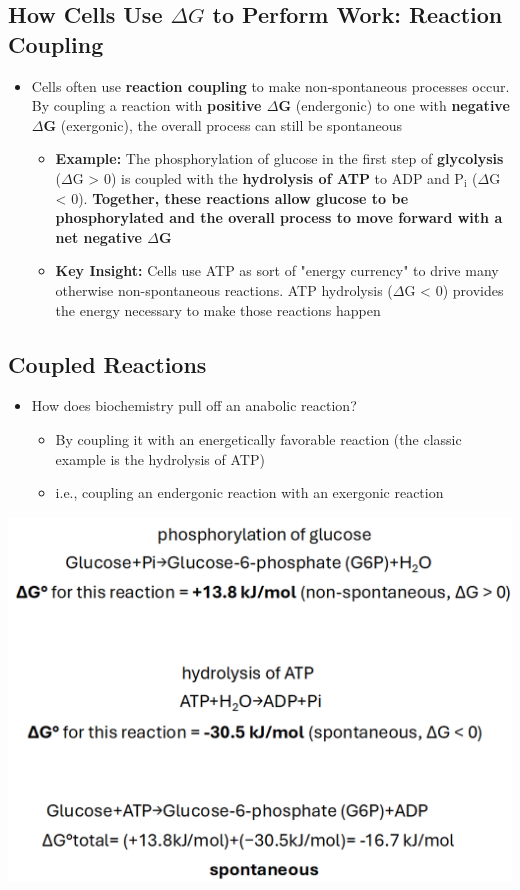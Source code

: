 \documentclass[10pt]{article}
\begin{document}
\subsection*{How Cells Use $\Delta G$ to Perform Work: Reaction Coupling}
\begin{itemize}
    \item Cells often use \textbf{reaction coupling} to make non-spontaneous processes occur.  By coupling a reaction with \textbf{positive $\Delta$G} (endergonic) to one with \textbf{negative $\Delta$G} (exergonic), the overall process can still be spontaneous
    \begin{itemize}
        \item \textbf{Example:} The phosphorylation of glucose in the first step of \textbf{glycolysis} ($\Delta$G > 0) is coupled with the \textbf{hydrolysis of ATP} to ADP and P$_\text{i}$ ($\Delta$G < 0).  \textbf{Together, these reactions allow glucose to be phosphorylated and the overall process to move forward with a net negative $\Delta$G}
        \item \textbf{Key Insight:} Cells use ATP as sort of "energy currency" to drive many otherwise non-spontaneous reactions.  ATP hydrolysis ($\Delta$G < 0) provides the energy necessary to make those reactions happen
    \end{itemize}
\end{itemize}

\subsection*{Coupled Reactions}
\begin{itemize}
    \item How does biochemistry pull off an anabolic reaction?
    \begin{itemize}
        \item By coupling it with an energetically favorable reaction (the classic example is the hydrolysis of ATP)
        \item i.e., coupling an endergonic reaction with an exergonic reaction
    \end{itemize}
\end{itemize}
\begin{center}
    \includegraphics[width=\textwidth]{L3_12.png}
\end{center}
\end{document}
